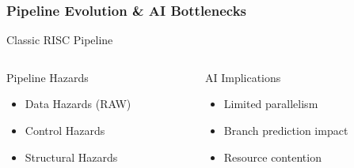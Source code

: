 \documentclass[aspectratio=169,t,xcolor=table]{beamer}
\begin{document}
\begin{frame}
    \frametitle{Pipeline Evolution \& AI Bottlenecks}
    
    \begin{block}{Classic RISC Pipeline}
        \begin{center}
        \end{center}
    \end{block}
    
    \begin{columns}[t]
        \begin{column}{0.48\textwidth}
            \begin{alertblock}{Pipeline Hazards}
                \small
                \begin{itemize}\setlength{\itemsep}{0pt}
                    \item Data Hazards (RAW)
                    \item Control Hazards
                    \item Structural Hazards
                \end{itemize}
            \end{alertblock}
        \end{column}
        
        \begin{column}{0.48\textwidth}
            \begin{exampleblock}{AI Implications}
                \small
                \begin{itemize}\setlength{\itemsep}{0pt}
                    \item Limited parallelism
                    \item Branch prediction impact
                    \item Resource contention
                \end{itemize}
            \end{exampleblock}
        \end{column}
    \end{columns}
    

\end{frame}
\end{document}
